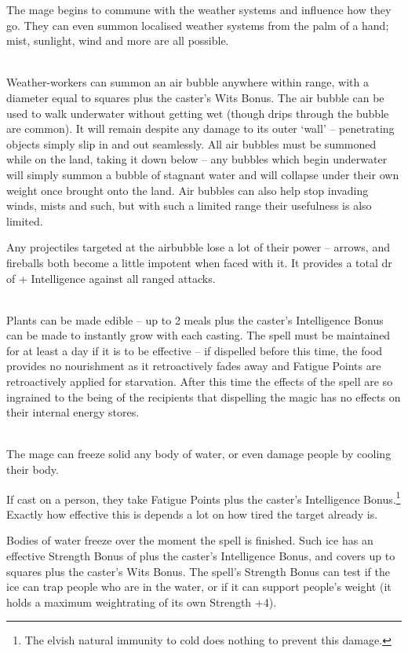\begin{multicols}{2}
\spelllevel

The mage begins to commune with the weather systems and influence how they go. They can even summon localised weather systems from the palm of a hand; mist, sunlight, wind and more are all possible.

\\
Weather-workers can summon an air bubble anywhere within range, with a diameter equal to  squares plus the caster's Wits Bonus. The air bubble can be used to walk underwater without getting wet (though drips through the bubble are common). It will remain despite any damage to its outer `wall' -- penetrating objects simply slip in and out seamlessly. All air bubbles must be summoned while on the land, taking it down below -- any bubbles which begin underwater will simply summon a bubble of stagnant water and will collapse under their own weight once brought onto the land. Air bubbles can also help stop invading winds, mists and such, but with such a limited range their usefulness is also limited.

Any projectiles targeted at the airbubble lose a lot of their power -- arrows, and fireballs both become a little impotent when faced with it.
It provides a total \gls{dr} of  + Intelligence against all ranged attacks.

\\
Plants can be made edible -- up to 2 meals plus the caster's Intelligence Bonus can be made to instantly grow with each casting. The spell must be maintained for at least a day if it is to be effective -- if dispelled before this time, the food provides no nourishment as it retroactively fades away and Fatigue Points are retroactively applied for starvation. After this time the effects of the spell are so ingrained to the being of the recipients that dispelling the magic has no effects on their internal energy stores.

\\
The mage can freeze solid any body of water, or even damage people by cooling their body.

If cast on a person, they take  Fatigue Points plus the caster's Intelligence Bonus.\footnote{The elvish natural immunity to cold does nothing to prevent this damage.}
Exactly how effective this is depends a lot on how tired the target already is.

Bodies of water freeze over the moment the spell is finished.
Such ice has an effective Strength Bonus of  plus the caster's Intelligence Bonus, and covers up to  squares plus the caster's Wits Bonus.
The spell's Strength Bonus can test if the ice can trap people who are in the water, or if it can support people's weight (it holds a maximum \gls{weightrating} of its own Strength +4).


\end{multicols}
